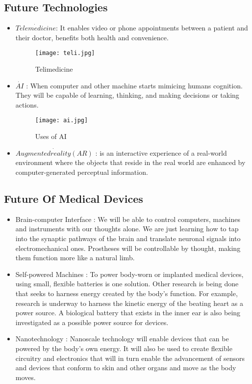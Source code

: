 \documentclass[12pt]{article}
\begin{document}
\subsection* {\LARGE Future Technologies }
\begin{itemize}
\item \Large $ \dot{Telemedicine } $: It enables video or phone appointments between a patient and their doctor, benefits both health and convenience.
\begin{figure}[h]
\centering
\texttt{[image: teli.jpg]}
\caption{Telimedicine}
\end{figure}

\item \Large $ \dot{AI} $ : When computer and other machine starts mimicing humans cognition. They will be capable of learning, thinking, and making decisions or taking actions. 
\begin{figure}[h]
\centering
\texttt{[image: ai.jpg]}
\caption{Uses of AI}
\end{figure}

\item \Large $ \dot{Augmented reality (AR) } $ : is an interactive experience of a real-world environment where the objects that reside in the real world are enhanced by computer-generated perceptual information.

\end{itemize}


\subsection* {\LARGE Future Of Medical Devices }
\begin{itemize}
\item Brain-computer Interface : We will be able to control computers, machines and instruments with our thoughts alone. We are just learning  how to tap into the synaptic pathways of the brain and translate neuronal signals into electromechanical ones. Prostheses will be controllable by thought, making them function more like a natural limb.
\newline
 
\item Self-powered Machines : To power body-worn or implanted medical devices, using small, flexible batteries is one solution. Other research is being done that seeks to harness energy created by the body’s function. For example, research is underway to harness the kinetic energy of the beating heart as a power source. A biological battery that exists in the inner ear is also being investigated as a possible power source for devices.
\newline
\item Nanotechnology : Nanoscale technology will enable devices that can be powered by the body’s own energy. It will also be used to create flexible circuitry and electronics that will in turn enable the advancement of sensors and devices that conform to skin and other organs and move as the body moves.
\end{itemize}
\end{document}

